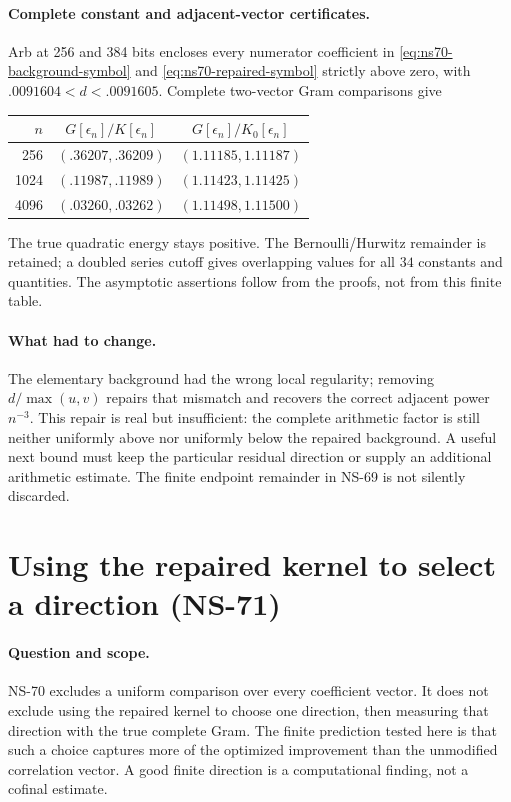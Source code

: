 \paragraph{Complete constant and adjacent-vector certificates.}
Arb at 256 and 384 bits encloses every numerator coefficient in
\eqref{eq:ns70-background-symbol} and
\eqref{eq:ns70-repaired-symbol} strictly above zero, with
$.0091604<d<.0091605$. Complete two-vector Gram comparisons give
\begin{center}\small
\begin{tabular}{rcc}
\toprule
$n$ & $G[\epsilon_n]/K[\epsilon_n]$
    & $G[\epsilon_n]/K_0[\epsilon_n]$\\
\midrule
256 & $(.36207,.36209)$ & $(1.11185,1.11187)$\\
1024 & $(.11987,.11989)$ & $(1.11423,1.11425)$\\
4096 & $(.03260,.03262)$ & $(1.11498,1.11500)$\\
\bottomrule
\end{tabular}\end{center}
The true quadratic energy stays positive. The Bernoulli/Hurwitz
remainder is retained; a doubled series cutoff gives overlapping
values for all $34$ constants and quantities. The asymptotic assertions
follow from the proofs, not from this finite table.

\paragraph{What had to change.}
The elementary background had the wrong local regularity; removing
$d/\max(u,v)$ repairs that mismatch and recovers the correct adjacent
power $n^{-3}$. This repair is real but insufficient: the complete
arithmetic factor is still neither uniformly above nor uniformly below
the repaired background. A useful next bound must keep the particular
residual direction or supply an additional arithmetic estimate. The
finite endpoint remainder in NS-69 is not silently discarded.

\section{Using the repaired kernel to select a direction (NS-71)}
\label{sec:ns71-selected-preconditioner}

\paragraph{Question and scope.}
NS-70 excludes a uniform comparison over every coefficient vector.
It does not exclude using the repaired kernel to choose one direction,
then measuring that direction with the true complete Gram. The finite
prediction tested here is that such a choice captures more of the
optimized improvement than the unmodified correlation vector. A good
finite direction is a computational finding, not a cofinal estimate.

